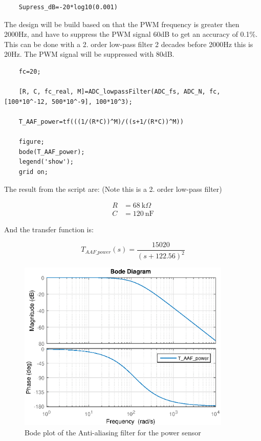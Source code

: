 \begin{lstlisting}
	Supress_dB=-20*log10(0.001)
\end{lstlisting}

The design will be build based on that the PWM frequency is greater then 2000Hz, and have to suppress the PWM signal 60dB to get an  accuracy of 0.1\%. This can be done with a 2. order low-pass filter 2 decades before 2000Hz this is 20Hz. The PWM signal will be suppressed with 80dB.
	
\begin{lstlisting}
	fc=20;
	
	[R, C, fc_real, M]=ADC_lowpassFilter(ADC_fs, ADC_N, fc, [100*10^-12, 500*10^-9], 100*10^3);
	
	T_AAF_power=tf(((1/(R*C))^M)/((s+1/(R*C))^M))
	
	figure;
	bode(T_AAF_power);
	legend('show');
	grid on;
\end{lstlisting}

The result from the script are: (Note this is a 2. order low-pass filter)
	
\begin{equation}
	\begin{split}
	R &= \SI{68}{\kilo\Omega}\\
	C &= \SI{120}{\nano\F}
	\end{split}
\end{equation}
	
And the transfer function is: 
	
\begin{equation}
	T_{{AAF\_power}}(s) = \frac{15020}{{(s + 122.56)}^{2}}
\end{equation}
	
\begin{figure}[H]
	\centering
	\includegraphics [width=4in]{Hardware/Pictures/FilterAnalyse_02.eps}
	\caption{Bode plot of the Anti-aliasing filter for the power sensor}
	\label{fig:BODE_AAF_power}
\end{figure}

